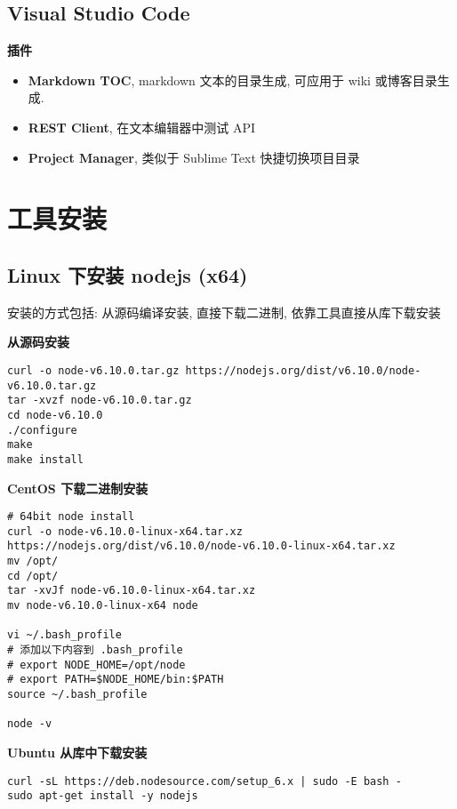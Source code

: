 \subsection{Visual Studio Code}\label{visual-studio-code}

\textbf{插件}

\begin{itemize}
\tightlist
\item
  \textbf{Markdown TOC}, markdown 文本的目录生成, 可应用于 wiki
  或博客目录生成.
\item
  \textbf{REST Client}, 在文本编辑器中测试 API
\item
  \textbf{Project Manager}, 类似于 Sublime Text 快捷切换项目目录
\end{itemize}

\section{工具安装}\label{ux5de5ux5177ux5b89ux88c5}

\subsection{Linux 下安装 nodejs
(x64)}\label{linux-ux4e0bux5b89ux88c5-nodejs-x64}

安装的方式包括: 从源码编译安装, 直接下载二进制, 依靠工具直接从库下载安装

\textbf{从源码安装}

\begin{verbatim}
curl -o node-v6.10.0.tar.gz https://nodejs.org/dist/v6.10.0/node-v6.10.0.tar.gz
tar -xvzf node-v6.10.0.tar.gz
cd node-v6.10.0
./configure
make
make install
\end{verbatim}

\textbf{CentOS 下载二进制安装}

\begin{verbatim}
# 64bit node install
curl -o node-v6.10.0-linux-x64.tar.xz https://nodejs.org/dist/v6.10.0/node-v6.10.0-linux-x64.tar.xz
mv /opt/
cd /opt/
tar -xvJf node-v6.10.0-linux-x64.tar.xz
mv node-v6.10.0-linux-x64 node

vi ~/.bash_profile
# 添加以下内容到 .bash_profile
# export NODE_HOME=/opt/node
# export PATH=$NODE_HOME/bin:$PATH
source ~/.bash_profile

node -v
\end{verbatim}

\textbf{Ubuntu 从库中下载安装}

\begin{verbatim}
curl -sL https://deb.nodesource.com/setup_6.x | sudo -E bash -
sudo apt-get install -y nodejs
\end{verbatim}

